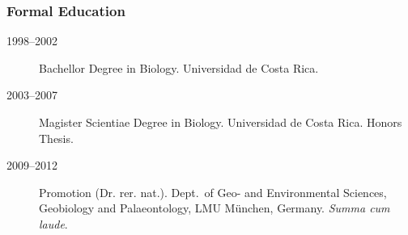 \documentclass[letter,10pt]{article}
\begin{document}
\subsubsection*{Formal Education}
\begin{description}
\item[1998--2002] Bachellor Degree in Biology. Universidad de Costa Rica.

\item[2003--2007] Magister Scientiae Degree in Biology. Universidad de Costa Rica. Honors Thesis.

\item[2009--2012] Promotion (Dr. rer. nat.). Dept.~of Geo- and Environmental Sciences, Geobiology and Palaeontology, LMU M\"unchen, Germany. \emph{Summa cum laude}.
\end{description}
\end{document}
